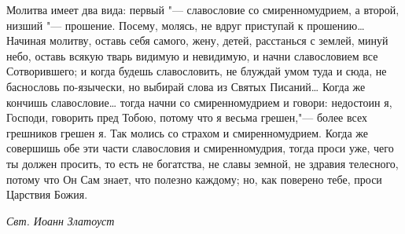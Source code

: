 \begin{mymulticols}

Молитва имеет два вида: первый "--- славословие со смиренномудрием, а второй, низший "--- прошение. Посему, молясь, не вдруг приступай к прошению… Начиная молитву, оставь себя самого, жену, детей, расстанься с землей, минуй небо, оставь всякую тварь видимую и невидимую, и начни славословием все Сотворившего; и когда будешь славословить, не блуждай умом туда и сюда, не баснословь по-язычески, но выбирай слова из Святых Писаний… Когда же кончишь славословие… тогда начни со смиренномудрием и говори: недостоин я, Господи, говорить пред Тобою, потому что я весьма грешен,"--- более всех грешников грешен я. Так молись со страхом и смиренномудрием. Когда же совершишь обе эти части славословия и смиренномудрия, тогда проси уже, чего ты должен просить, то есть не богатства, не славы земной, не здравия телесного, потому что Он Сам знает, что полезно каждому; но, как поверено тебе, проси Царствия Божия.


\bigskip\emph{Свт. Иоанн Златоуст}

\end{mymulticols}
 


\mychapterending

 
